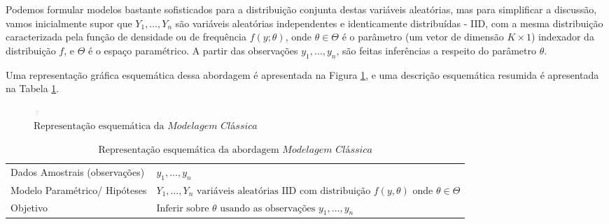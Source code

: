 \documentclass[
  12pt,
  brazilian,
]{book}
\theoremstyle{definition}
\theoremstyle{definition}
\theoremstyle{definition}
\theoremstyle{definition}
\theoremstyle{remark}
\begin{document}
Podemos formular modelos bastante sofisticados para a distribuição conjunta
destas variáveis aleatórias, mas para simplificar a discussão, vamos inicialmente
supor que \(Y_1, \ldots ,Y_n\) são variáveis aleatórias independentes e
identicamente distribuídas - IID, com a mesma distribuição caracterizada pela função
de densidade ou de frequência \(f(y;\theta)\), onde \(\theta \in \Theta\) é o parâmetro
(um vetor de dimensão \(K \times 1\)) indexador da distribuição \(f\), e \(\Theta\) é
o espaço paramétrico. A partir das observações \(y_1, \ldots ,y_n\), são feitas inferências a respeito do parâmetro \(\theta\).

Uma representação gráfica esquemática dessa abordagem é apresentada na Figura
\ref{fig:modclas}, e uma descrição esquemática resumida é apresentada na Tabela
\ref{tab:modelclass}.

\begin{figure}

{\centering \includegraphics[width=10,6in]{Figuras/Figura2.1} 

}

\caption{$\text{Representação esquemática da }\textit{Modelagem Clássica}$}\label{fig:modclas}
\end{figure}

\begin{table}[H]

\caption{\label{tab:modelclass}$\text{Representação esquemática da abordagem }\textit{Modelagem Clássica}$}
\centering
\begin{tabular}[t]{>{\raggedright\arraybackslash}p{4.5cm}l}
\toprule
Dados Amostrais (observações) & $y_1, \ldots, y_n$\\
Modelo Paramétrico/ Hipóteses & $Y_1, \ldots , Y_n 
     \text{ variáveis aleatórias IID com distribuição } f(y,\theta) \text{ onde } \theta \in \Theta$\\
Objetivo & $\text{Inferir sobre } \theta 
     \text{ usando as observações } y_1, \ldots, y_n$\\
\bottomrule
\end{tabular}
\end{table}
\end{document}
